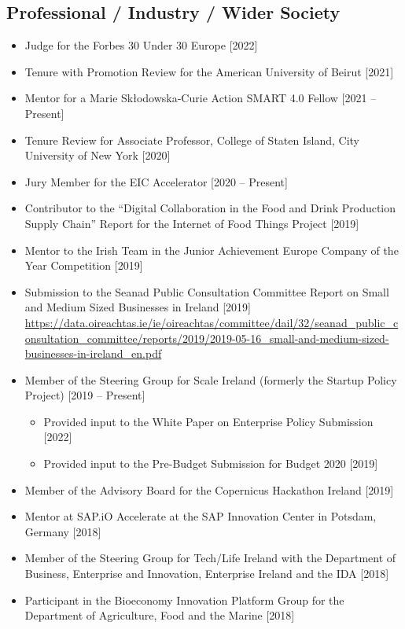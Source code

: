 \documentclass[10pt,a4paper]{res} %
\begin{document}
\begin{resume}
\subsection*{Professional / Industry / Wider Society}

\begin{itemize} \itemsep -2pt
\item Judge for the Forbes 30 Under 30 Europe [2022]
\item Tenure with Promotion Review for the American University of Beirut [2021]
\item Mentor for a Marie Sk\l{}odowska-Curie Action SMART 4.0 Fellow [2021 -- Present] 
\item Tenure Review for Associate Professor, College of Staten Island, City University of New York [2020]
\item Jury Member for the EIC Accelerator [2020 -- Present]
\item Contributor to the ``Digital Collaboration in the Food and Drink Production Supply Chain'' Report for the Internet of Food Things Project [2019]
\item Mentor to the Irish Team in the Junior Achievement Europe Company of the Year Competition [2019]
\item Submission to the Seanad Public Consultation Committee Report on Small and Medium Sized Businesses in Ireland [2019] \url{https://data.oireachtas.ie/ie/oireachtas/committee/dail/32/seanad_public_consultation_committee/reports/2019/2019-05-16_small-and-medium-sized-businesses-in-ireland_en.pdf}
\item Member of the Steering Group for Scale Ireland (formerly the Startup Policy Project) [2019 -- Present]
\begin{itemize} \itemsep -2pt
\item Provided input to the White Paper on Enterprise Policy Submission [2022]
\item Provided input to the Pre-Budget Submission for Budget 2020 [2019]
\end{itemize}
\item Member of the Advisory Board for the Copernicus Hackathon Ireland [2019]
\item Mentor at SAP.iO Accelerate at the SAP Innovation Center in Potsdam, Germany [2018]
\item Member of the Steering Group for Tech/Life Ireland with the Department of Business, Enterprise and Innovation, Enterprise Ireland and the IDA [2018]
\item Participant in the Bioeconomy Innovation Platform Group for the Department of Agriculture, Food and the Marine [2018]

\end{itemize}
\end{resume}
\end{document}
